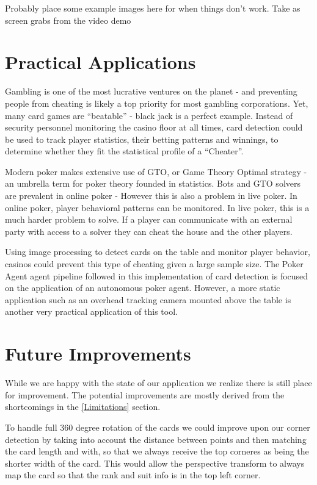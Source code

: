 \documentclass[conference]{IEEEtran}
\begin{document}
Probably place some example images here for when things don't work. Take as screen grabs from the
video demo


\section{Practical Applications}
Gambling is one of the most lucrative ventures on the planet - and preventing people from cheating
is likely a top priority for most gambling corporations. Yet, many card games are ``beatable'' - black
jack is a perfect example. Instead of security personnel monitoring the casino floor at all times,
card detection could be used to track player statistics, their betting patterns and winnings, to
determine whether they fit the statistical profile of a ``Cheater''.

Modern poker makes extensive use of GTO, or Game Theory Optimal strategy - an umbrella term for
poker theory founded in statistics. Bots and GTO solvers are prevalent in online poker - However
this is also a problem in live poker. In online poker, player behavioral patterns can be monitored.
In live poker, this is a much harder problem to solve. If a player can communicate with an external
party with access to a solver they can cheat the house and the other players.

Using image processing to detect cards on the table and monitor player behavior, casinos could
prevent this type of cheating given a large sample size. The Poker Agent agent pipeline followed in
this implementation of card detection is focused on the application of an autonomous poker agent.
However, a more static application such as an overhead tracking camera mounted above the table is
another very practical application of this tool.


\section{Future Improvements}
While we are happy with the state of our application we realize there is still place for
improvement. The potential improvements are mostly derived from the shortcomings in the
\ref{Limitations} section.

To handle full 360 degree rotation of the cards we could improve upon our corner detection by taking
into account the distance between points and then matching the card length and with, so that we
always receive the top corneres as being the shorter width of the card. This would allow the
perspective transform to always map the card so that the rank and suit info is in the top left
corner.
\end{document}
